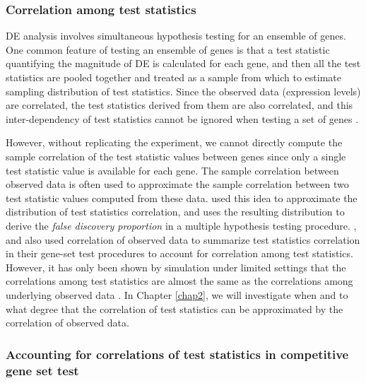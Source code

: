 \subsubsection{Correlation among test statistics}
DE analysis involves simultaneous hypothesis testing for an ensemble of genes. 
One common feature of testing an ensemble of genes is that a test statistic quantifying the 
magnitude of DE is calculated for each gene, and then all the test statistics are pooled together 
and treated as a sample from which to estimate sampling distribution of test statistics. Since the 
observed data (expression levels) are correlated, the test statistics derived from them are 
also correlated, and this inter-dependency of test statistics cannot be ignored when testing a set 
of genes \citep{barry2008statistical, efron2007correlation, wu2012camera}. 

However, without replicating the experiment, we cannot directly compute
the sample correlation %
of the test statistic values between genes since only a single test statistic
value is available for each gene. The sample correlation between observed data is often used to 
approximate the sample correlation between two test statistic values computed from these data.
\citet{efron2007correlation} used this idea to approximate the 
distribution of test statistics correlation, and uses the resulting distribution 
to  derive the \textit{false discovery proportion} in a multiple hypothesis testing procedure. 
\citet{barry2008statistical}, \citet{wu2012camera} and
\citet{yaari2013quantitative} also used 
correlation of observed data to summarize test statistics correlation in their
gene-set test procedures to account for correlation among test statistics.
However, it has only been shown by simulation under limited settings that the correlations among 
test statistics are almost the same as the correlations among underlying observed data 
\cite{barry2008statistical,efron2007correlation}. 
In Chapter \ref{chap2}, we will investigate when and to what degree that the correlation of test 
statistics can be approximated by the correlation of observed data.


\subsubsection{Accounting for correlations of test statistics in competitive gene set test}

